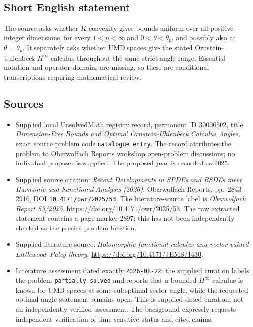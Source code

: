 \documentclass[11pt]{article}
\begin{document}
\subsection{Short English statement}
The source asks whether \(K\)-convexity gives bounds uniform over all positive integer dimensions, for every \(1<p<\infty\) and \(0<\theta<\theta_p\), and possibly also at \(\theta=\theta_p\). It separately asks whether UMD spaces give the stated Ornstein--Uhlenbeck \(H^\infty\) calculus throughout the same strict angle range. Essential notation and operator domains are missing, so these are conditional transcriptions requiring mathematical review.
\subsection{Sources}
\begin{itemize}
\item Supplied local UnsolvedMath registry record, permanent ID \(30006502\), title \emph{Dimension-Free Bounds and Optimal Ornstein-Uhlenbeck Calculus Angles}, exact source problem code \texttt{catalogue entry}. The record attributes the problem to Oberwolfach Reports workshop open-problem discussions; no individual proposer is supplied. The proposed year is recorded as 2025.
\item Supplied source citation: \emph{Recent Developments in SPDEs and BSDEs meet Harmonic and Functional Analysis (2026)}, Oberwolfach Reports, pp.\ 2843--2916, DOI \texttt{10.4171/owr/2025/53}. The literature-source label is \emph{Oberwolfach Report 53/2025}. \url{https://doi.org/10.4171/owr/2025/53}. The raw extracted statement contains a page marker 2897; this has not been independently checked as the precise problem location.
\item Supplied literature source: \emph{Holomorphic functional calculus and vector-valued Littlewood--Paley theory}. \url{https://doi.org/10.4171/JEMS/1430}.
\item Literature assessment dated exactly \texttt{2026-08-22}: the supplied curation labels the problem \texttt{partially\_solved} and reports that a bounded \(H^\infty\) calculus is known for UMD spaces at some suboptimal sector angle, while the requested optimal-angle statement remains open. This is supplied dated curation, not an independently verified assessment. The background expressly requests independent verification of time-sensitive status and cited claims.
\end{itemize}
\end{document}

